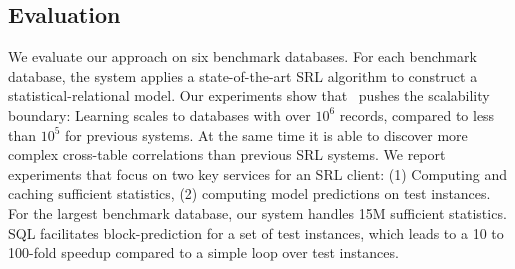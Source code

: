 \documentclass{IEEEtran}
\begin{document}
%

\subsection{Evaluation} We evaluate our approach on six benchmark databases. For each benchmark database, the system applies a state-of-the-art SRL algorithm to construct a statistical-relational model.
Our experiments show that \FB\ pushes the scalability boundary: Learning scales to databases with over $10^6$ records, compared to less than $10^5$ for previous systems. At the same time it is able to discover more complex cross-table correlations than previous SRL systems. We report experiments that focus on two key services for an SRL client: (1) Computing and caching sufficient statistics, (2) computing model predictions on test instances. For the largest benchmark database, our system handles 15M sufficient statistics. 
SQL facilitates block-prediction for a set of test instances, which leads to a 10 to 100-fold speedup compared to a simple loop over test instances.
\end{document}
